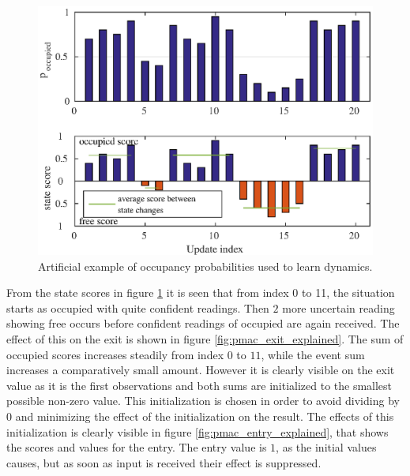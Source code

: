 \begin{figure} [htbp]
    \centering
    \includegraphics[scale=1]{chapters/mapping_of_dynamic_areas/figures/state_scores_explained}
    \caption{Artificial example of occupancy probabilities used to learn dynamics.}
    \label{fig:state_scores_explained}
\end{figure}

From the state scores in figure \ref{fig:state_scores_explained} it is seen that from index 0 to 11, the situation starts as occupied with quite confident readings. Then $2$ more uncertain reading showing free occurs before confident readings of occupied are again received. The effect of this on the exit is shown in figure \ref{fig:pmac_exit_explained}. The sum of occupied scores increases steadily from index $0$ to $11$, while the event sum increases a comparatively small amount. However it is clearly visible on the exit  value as it is the first observations and both sums are initialized to the smallest possible non-zero value. This initialization is chosen in order to avoid dividing by $0$ and minimizing the effect of the initialization on the result. The effects of this initialization is clearly visible in figure \ref{fig:pmac_entry_explained}, that shows the scores and values for the entry. The entry value is $1$, as the initial values causes, but as soon as input is received their effect is suppressed.

